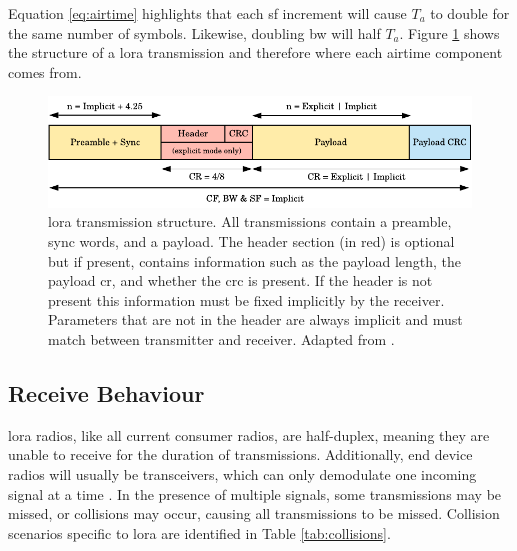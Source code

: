 Equation \ref{eq:airtime} highlights that each \ac{sf} increment will cause $T_a$ to double for the same  number of symbols. Likewise, doubling \ac{bw} will half $T_a$. Figure \ref{lora_transmission_structure} shows the structure of a \ac{lora} transmission and therefore where each airtime component comes from. 

\begin{figure}[H]
    \centering
   	\includegraphics{Figures/lora_transmission}
    \caption[\ac{lora} transmission packet structure]{
   \ac{lora} transmission structure. All transmissions contain a preamble, sync words, and a payload. The header section (in red) is optional but if present, contains information such as the payload length, the payload \ac{cr}, and whether the \ac{crc} is present. If the header is not present this information must be fixed implicitly by the receiver. Parameters that are not in the header are always implicit and must match between transmitter and receiver. Adapted from \cite{3YP:LORA_SX12}.
    }
    \label{lora_transmission_structure}
\end{figure}


\subsection{Receive Behaviour}
\label{sec:lora_considerations}
\ac{lora} radios, like all current consumer radios, are half-duplex, meaning they are unable to receive for the duration of transmissions. Additionally, end device radios will usually be transceivers, which can only demodulate one incoming signal at a time \cite{3YP:LORA_SX12}. In the presence of multiple signals, some transmissions may be missed, or collisions may occur, causing all transmissions to be missed. Collision scenarios specific to \ac{lora} are identified in Table \ref{tab:collisions}. 

